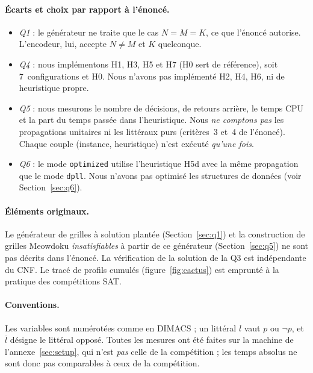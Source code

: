 \documentclass[11pt,a4paper]{article}
\begin{document}
\paragraph{Écarts et choix par rapport à l'énoncé.}
\begin{itemize}
\item \emph{Q1} : le générateur ne traite que le cas $N=M=K$, ce que l'énoncé autorise. L'encodeur, lui, accepte $N\neq M$ et $K$ quelconque.
\item \emph{Q4} : nous implémentons H1, H3, H5 et H7 (H0 sert de référence), soit 7~configurations et H0. Nous n'avons pas implémenté H2, H4, H6, ni de heuristique propre.
\item \emph{Q5} : nous mesurons le nombre de décisions, de retours arrière, le temps CPU et la part du temps passée dans l'heuristique. Nous \emph{ne comptons pas} les propagations unitaires ni les littéraux purs (critères~3 et~4 de l'énoncé). Chaque couple (instance, heuristique) n'est exécuté \emph{qu'une fois}.
\item \emph{Q6} : le mode \texttt{optimized} utilise l'heuristique H5d avec la même propagation que le mode \texttt{dpll}. Nous n'avons pas optimisé les structures de données (voir Section~\ref{sec:q6}).
\end{itemize}

\paragraph{Éléments originaux.} Le générateur de grilles à solution plantée (Section~\ref{sec:q1}) et la construction de grilles Meowdoku \emph{insatisfiables} à partir de ce générateur (Section~\ref{sec:q5}) ne sont pas décrits dans l'énoncé. La vérification de la solution de la Q3 est indépendante du CNF. Le tracé de profils cumulés (figure~\ref{fig:cactus}) est emprunté à la pratique des compétitions SAT.


\paragraph{Conventions.} Les variables sont numérotées comme en DIMACS ; un littéral $l$ vaut $p$ ou $\neg p$, et $\bar l$ désigne le littéral opposé. Toutes les mesures ont été faites sur la machine de l'annexe~\ref{sec:setup}, qui n'est \emph{pas} celle de la compétition ; les temps absolus ne sont donc pas comparables à ceux de la compétition.
\end{document}

